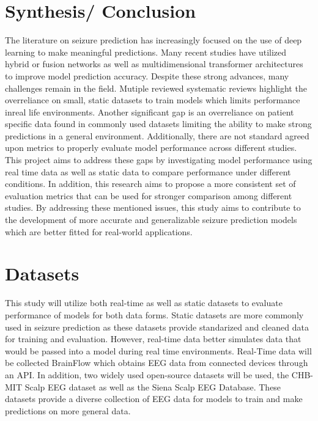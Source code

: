 \documentclass[conference]{IEEEtran}
\begin{document}
\section{Synthesis/ Conclusion}
\noindent The literature on seizure prediction has increasingly focused on the use of deep learning to make meaningful predictions. Many recent studies have utilized hybrid or fusion networks as well as multidimensional transformer architectures to improve model prediction accuracy. Despite these strong advances, many challenges remain in the field. Mutiple reviewed systematic reviews highlight the overreliance on small, static datasets to train models which limits performance inreal life environments. Another significant gap is an overreliance on patient specific data found in commonly used datasets limiting the ability to make strong predictions in a general environment. Additionally, there are not standard agreed upon metrics to properly evaluate model performance across different studies. This project aims to address these gaps by investigating model performance using real time data as well as static data to compare performance under different conditions. In addition, this research aims to propose a more consistent set of evaluation metrics that can be used for stronger comparison among different studies. By addressing these mentioned issues, this study aims to contribute to the development of more accurate and generalizable seizure prediction models which are better fitted for real-world applications.
\nocite{*}
\section{Datasets}
\noindent This study will utilize both real-time as well as static datasets to evaluate performance of models for both data forms. Static datasets are more commonly used in seizure prediction as these datasets provide standarized and cleaned data for training and evaluation. However, real-time data better simulates data that would be passed into a model during real time environments. Real-Time data will be collected BrainFlow which obtains EEG data from connected devices through an API. In addition, two widely used open-source datasets will be used, the CHB-MIT Scalp EEG dataset as well as the Siena Scalp EEG Database. These datasets provide a diverse collection of EEG data for models to train and make predictions on more general data.
\end{document}
